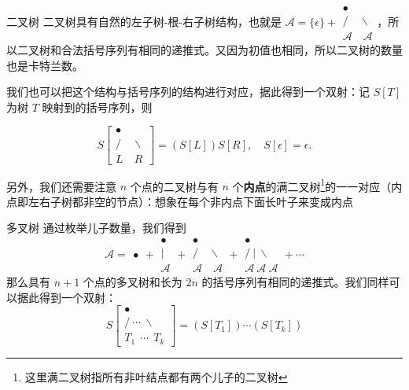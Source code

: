 \begin{frame}{二叉树}
    二叉树具有自然的左子树-根-右子树结构，也就是 $
\mathcal A=\{\epsilon\}+\begin{array}{c}
\bullet \\
/ \quad \backslash \\
\mathcal A \quad \mathcal A
\end{array}
$，所以二叉树和合法括号序列有相同的递推式。又因为初值也相同，所以二叉树的数量也是卡特兰数。

我们也可以把这个结构与括号序列的结构进行对应，据此得到一个双射：记 $S[T]$ 为树 $T$ 映射到的括号序列，则

$$
S\left[\begin{array}{c}
    \bullet \\
    / \quad \backslash \\
    L \quad R
    \end{array}\right]=(S[L])S[R],\quad S[\epsilon]=\epsilon.
$$

另外，我们还需要注意 $n$ 个点的二叉树与有 $n$ 个\textbf{内点}的满二叉树\footnote{这里满二叉树指所有非叶结点都有两个儿子的二叉树}的一一对应（内点即左右子树都非空的节点）：想象在每个非内点下面长叶子来变成内点

\end{frame}
\begin{frame}{多叉树}
    通过枚举儿子数量，我们得到
    $$
    \mathcal A=\begin{array}{c}\bullet\end{array}+\begin{array}{c}
        \bullet \\
        |  \\
        \mathcal A
        \end{array}
        +\begin{array}{c}
        \bullet \\
        / \quad \backslash \\
        \mathcal A \quad \mathcal A
        \end{array}
        +\begin{array}{c}
            \bullet \\
            / \  |\  \backslash \\
            \mathcal A \  \mathcal A \ \mathcal A
            \end{array}
        +\cdots
    $$
    那么具有 $n+1$ 个点的多叉树和长为 $2n$ 的括号序列有相同的递推式。我们同样可以据此得到一个双射：
    $$
    S\left[\begin{array}{c}
        \mathbf{\bullet} \\
        / \ \cdots\  \backslash \\
        T_1\ \ \cdots \ \  T_k
        \end{array}\right]=(S[T_1])\cdots(S[T_k])
    $$
\end{frame}
